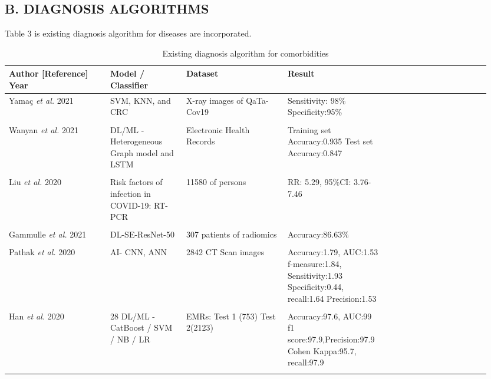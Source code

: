 \subsection*{B. DIAGNOSIS ALGORITHMS} 
Table 3 is existing diagnosis algorithm for diseases are incorporated. 
\begin{table*} 
\caption{Existing diagnosis algorithm for comorbidities} 
\label{tab:t1} 
\centering 
\begin{tabular} 
{p{0.20\linewidth} p{0.15\linewidth}p{0.20\linewidth}p{0.20\linewidth}p{0.20\linewidth}} 
\hline 
\textbf{Author [Reference] Year} & \textbf{Model / Classifier} & \textbf{Dataset} & \textbf{Result}\\ 
\hline 
Yamaç \emph{et al.} \cite{yamac2021convolutional} 2021 & 
SVM, KNN, and CRC & X-ray images of QaTa-Cov19 & Sensitivity: 98\% 
\newline 
Specificity:95\% 
\\\\ 
Wanyan \emph{et al.} \cite {wanyan2020relational} 2021 & DL/ML - Heterogeneous Graph model and LSTM 
& Electronic Health Records & Training set Accuracy:0.935 
\newline 
Test set Accuracy:0.847 
\\\\ 
Liu \emph{et al.} \cite {liu2020risk} 2020 & Risk factors of infection in COVID-19: RT-PCR & 11580 of 
persons & RR: 5.29, 95\%CI: 3.76-7.46 
\\\\ 
Gammulle \emph{et al.} \cite {gammulle2021multi} 2021 & 
DL-SE-ResNet-50 & 307 patients of radiomics & Accuracy:86.63\% 
\\\\ 
Pathak \emph{et al.} \cite {pathak2020deep} 2020 & AI- CNN, ANN & 2842 CT Scan images & 
Accuracy:1.79, AUC:1.53 
\newline f-measure:1.84, Sensitivity:1.93 
\newline 
Specificity:0.44, recall:1.64 
\newline 
Precision:1.53 
\\\\ 
Han \emph{et al.} \cite {han2020accurate} 2020 & 28 
DL/ML - CatBoost / SVM / NB / LR & EMRs: Test 1 (753) 
Test 2(2123) 
& Accuracy:97.6, AUC:99 
\newline f1 score:97.9,Precision:97.9 
\newline 
Cohen Kappa:95.7, recall:97.9 
\\\\ 
\hline 
\end{tabular} 
\end{table*} 
